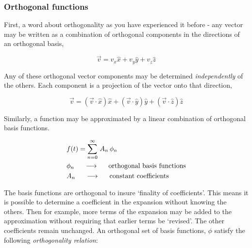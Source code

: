 \documentclass[12pt]{article}
\begin{document}
\begin{flushleft}
\hspace{.1in}
\subsubsection*{\color{mygreen} Orthogonal functions}

First, a word about orthogonality as you have experienced it before - any vector may be written as a combination of  orthogonal components in the directions of an orthogonal basis,

\[
\vec{v} = v_{x}\hat{x} +v_{y}\hat{y} +v_{z}\hat{z}
\]

Any of these orthogonal vector components may be determined {\it independently} of the others.  Each component is a projection of the vector onto that direction, 

\begin{equation}
\vec{v} = (\vec{v}\cdot \hat{x})\hat{x} +(\vec{v}\cdot \hat{y})\hat{y} + (\vec{v}\cdot \hat{z})\hat{z}
\label{eq:vect_comp}
\end{equation}

Similarly, a function may be approximated by a linear combination of orthogonal basis functions.

\begin{equation}
\begin{aligned}
& f(t) = \sum_{n=0}^{\infty} \, A_{n}\, \phi_{n} \\
& \phi_{n} \hspace{.2in} \longrightarrow \hspace{.2in} \text{orthogonal basis functions} \\
& A_{n}  \hspace{.2in} \longrightarrow \hspace{.2in} \text{constant coefficients} 
\label{eq:series_orth}
\end{aligned}
\end{equation}

The basis functions are orthogonal to insure `finality of coefficients'.   This means it is possible to determine a coefficient in the expansion without knowing the others.  Then for example, more terms of the expansion may be added to the approximation without requiring that earlier terms be `revised'.  The other coefficients remain unchanged.  An orthogonal set of basis functions, $\phi$ satisfy the following {\it orthogonality relation}:


\end{flushleft}
\end{document}

